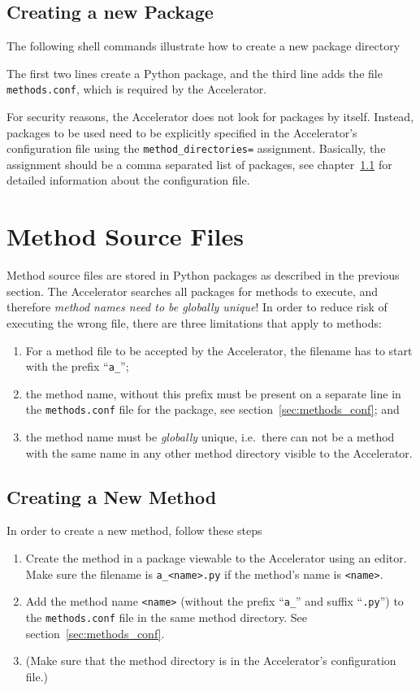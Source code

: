 \subsection{Creating a new Package}
The following shell commands illustrate how to create a new package
directory
\begin{shell}
\end{shell}
The first two lines create a Python package, and the third line adds
the file \texttt{methods.conf}, which is required by the Accelerator.

For security reasons, the Accelerator does not look for packages by
itself.  Instead, packages to be used need to be explicitly specified
in the Accelerator's configuration file using the
\texttt{method_directories=}
assignment.  Basically, the assignment should be a comma separated
list of packages, see chapter~\ref{} for detailed information about
the configuration file.


\section{Method Source Files}
Method source files are stored in Python packages as described in the
previous section.  The Accelerator searches all packages for methods
to execute, and therefore \textsl{method names need to be globally
unique}!  In order to reduce risk of executing the wrong file, there
are three limitations that apply to methods:
\begin{enumerate}
\item For a method file to be accepted by the Accelerator, the
  filename has to start with the prefix ``\texttt{a\_}'';
\item the method name, without this prefix must be present on a
  separate line in the \texttt{methods.conf} file for the package, see
  section~\ref{sec:methods_conf}; and
\item the method name must be \emph{globally} unique, i.e.\ there can
  not be a method with the same name in any other method directory
  visible to the Accelerator.
\end{enumerate}


\subsection{Creating a New Method}
In order to create a new method, follow these steps
\begin{enumerate}
\item Create the method in a package viewable to the Accelerator
    using an editor.  Make sure the filename is \texttt{a\_<name>.py} if
    the method's name is \texttt{<name>}.
\item Add the method name \texttt{<name>} (without the prefix ``\texttt{a\_}'' and
    suffix ``\texttt{.py}'') to the \texttt{methods.conf} file in the
    same method directory.  See section~\ref{sec:methods_conf}.
  \item (Make sure that the method directory is in the Accelerator's
    configuration file.)
\end{enumerate}


